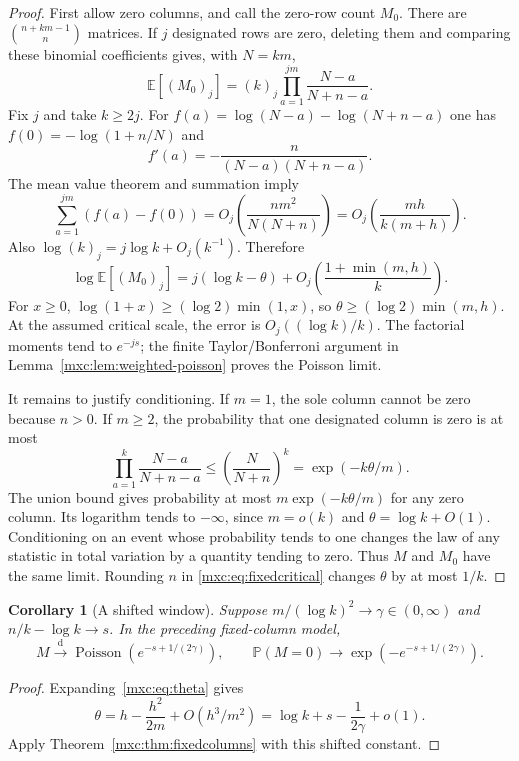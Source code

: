\documentclass[11pt]{article}
\numberwithin{equation}{section}
\newtheorem{corollary}[theorem]{Corollary}
\theoremstyle{definition}
\theoremstyle{remark}
\newcommand{\E}{\mathbb E}
\newcommand{\Pp}{\mathbb P}
\DeclareMathOperator{\Pois}{Poisson}
\begin{document}
\begin{proof}
First allow zero columns, and call the zero-row count $M_0$.
There are $\binom{n+km-1}{n}$ matrices. If $j$ designated rows
are zero, deleting them and comparing these binomial coefficients
gives, with $N=km$,
\begin{equation}\label{mxc:eq:fixedmoments}
 \E[(M_0)_j]=(k)_j\prod_{a=1}^{jm}\frac{N-a}{N+n-a}.
\end{equation}
Fix $j$ and take $k\ge2j$. For
$f(a)=\log(N-a)-\log(N+n-a)$ one has
$f(0)=-\log(1+n/N)$ and
\[
 f'(a)=-\frac{n}{(N-a)(N+n-a)}.
\]
The mean value theorem and summation imply
\[
 \sum_{a=1}^{jm}(f(a)-f(0))
 =O_j\!\left(\frac{nm^2}{N(N+n)}\right)
 =O_j\!\left(\frac{mh}{k(m+h)}\right).
\]
Also $\log(k)_j=j\log k+O_j(k^{-1})$. Therefore
\[
 \log\E[(M_0)_j]
 =j(\log k-\theta)+O_j\!\left(\frac{1+\min(m,h)}{k}\right).
\]
For $x\ge0$, $\log(1+x)\ge(\log2)\min(1,x)$, so
$\theta\ge(\log2)\min(m,h)$. At the assumed critical scale,
the error is $O_j((\log k)/k)$. The factorial moments tend to
$e^{-js}$; the finite Taylor/Bonferroni argument in
Lemma~\ref{mxc:lem:weighted-poisson} proves the Poisson limit.

It remains to justify conditioning. If $m=1$, the sole column
cannot be zero because $n>0$. If $m\ge2$, the probability that
one designated column is zero is at most
\[
 \prod_{a=1}^{k}\frac{N-a}{N+n-a}
 \le\left(\frac{N}{N+n}\right)^k
 =\exp(-k\theta/m).
\]
The union bound gives probability at most
$m\exp(-k\theta/m)$ for any zero column. Its logarithm tends to
$-\infty$, since $m=o(k)$ and $\theta=\log k+O(1)$.
Conditioning on an event whose probability tends to one changes
the law of any statistic in total variation by a quantity tending
to zero. Thus $M$ and $M_0$ have the same limit. Rounding $n$ in
\eqref{mxc:eq:fixedcritical} changes $\theta$ by at most $1/k$.
\end{proof}

\begin{corollary}[A shifted window]\label{mxc:cor:shifted-window}
Suppose $m/(\log k)^2\to\gamma\in(0,\infty)$ and
$n/k-\log k\to s$. In the preceding fixed-column model,
\begin{equation}\label{mxc:eq:shifted-window}
 M\xrightarrow{\mathrm d}\Pois\!\left(e^{-s+1/(2\gamma)}\right),
 \qquad
 \Pp(M=0)\longrightarrow\exp\!\left(-e^{-s+1/(2\gamma)}\right).
\end{equation}
\end{corollary}
\begin{proof}
Expanding~\eqref{mxc:eq:theta} gives
\[
 \theta=h-\frac{h^2}{2m}+O(h^3/m^2)
 =\log k+s-\frac1{2\gamma}+o(1).
\]
Apply Theorem~\ref{mxc:thm:fixedcolumns} with this shifted constant.
\end{proof}
\end{document}
